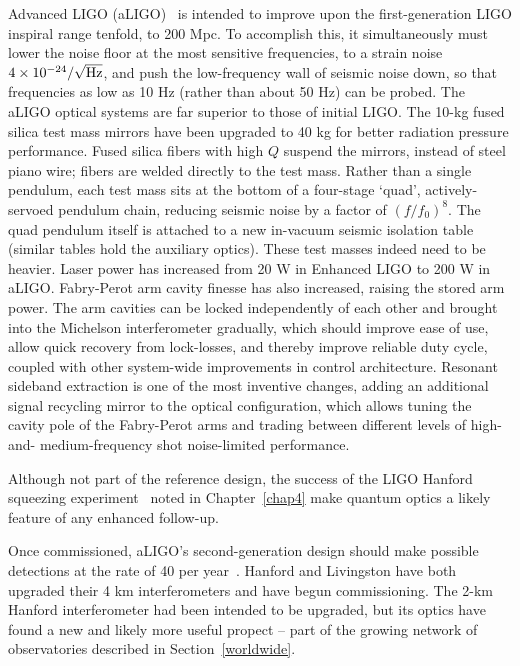 	Advanced LIGO (aLIGO)~\cite{aLIGOrefDesign,aLIGOsysDesign} is intended to improve upon the first-generation LIGO inspiral range tenfold, to 200 Mpc.
To accomplish this, it simultaneously must lower the noise floor at the most sensitive frequencies, to a strain noise  $4\times10^{-24}/\sqrt{\textup{Hz}}$, and push the low-frequency wall of seismic noise down, so that frequencies as low as 10 Hz (rather than about 50 Hz) can be probed.
The aLIGO optical systems are far superior to those of initial LIGO.
The 10-kg fused silica test mass mirrors have been upgraded to 40 kg for better radiation pressure performance.
Fused silica fibers with high $Q$ suspend the mirrors, instead of steel piano wire; fibers are welded directly to the test mass.
Rather than a single pendulum, each test mass sits at the bottom of a four-stage `quad', actively-servoed pendulum chain, reducing seismic noise by a factor of $(f/f_0)^8$.
The quad pendulum itself is attached to a new in-vacuum seismic isolation table (similar tables hold the auxiliary optics).
These test masses indeed need to be heavier.
Laser power has increased from 20 W in Enhanced LIGO to 200 W in aLIGO.
Fabry-Perot arm cavity finesse has also increased, raising the stored arm power.
The arm cavities can be locked independently of each other and brought into the Michelson interferometer gradually, which should improve ease of use, allow quick recovery from lock-losses, and thereby improve reliable duty cycle, coupled with other system-wide improvements in control architecture.
Resonant sideband extraction is one of the most inventive changes, adding an additional signal recycling mirror to the optical configuration, which allows tuning the cavity pole of the Fabry-Perot arms and trading between different levels of high- and- medium-frequency shot noise-limited performance.

Although not part of the reference design, the success of the LIGO Hanford squeezing experiment~\cite{BarsottiNatureSqueezing,ChuaBackscatteredLight,DwyerPhaseNoise} noted in Chapter~\ref{chap4} make quantum optics a likely feature of any enhanced follow-up.

Once commissioned, aLIGO's second-generation design should make possible detections at the rate of 40 per year~\cite{AbadieRates2010}. 
Hanford and Livingston have both upgraded their 4 km interferometers and have begun commissioning.
The 2-km Hanford interferometer had been intended to be upgraded, but its optics have found a new and likely more useful propect -- part of the growing network of observatories described in Section~\ref{worldwide}.

